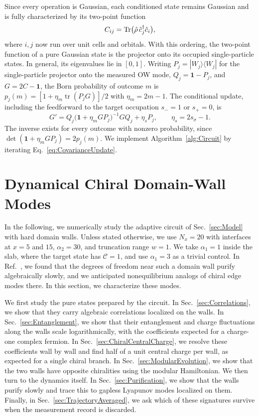 \documentclass[aps,prb,twocolumn,superscriptaddress,longbibliography,floatfix]{revtex4-2}
\newcommand{\mc}[1]{\mathcal{#1}}
\newcommand{\Id}{\mathbf{1}}
\begin{document}
Since every operation is Gaussian, each conditioned state remains Gaussian and is fully characterized by its two-point function
\begin{equation}
    C_{ij}=\Tr\!\big(\hat\rho\,\hat c_j^\dagger\hat c_i\big),
    \label{eq:TwoPoint}
\end{equation}
where $i,j$ now run over unit cells and orbitals. With this ordering, the two-point function of a pure Gaussian state is the projector onto its occupied single-particle states. In general, its eigenvalues lie in $[0,1]$. Writing $P_j=|W_j\rangle\langle W_j|$ for the single-particle projector onto the measured OW mode, $Q_j=\Id-P_j$, and $G=2C-\Id$, the Born probability of outcome $m$ is $p_j(m)=[1+\eta_m\operatorname{tr}(P_jG)]/2$ with $\eta_m=2m-1$. The conditional update, including the feedforward to the target occupation $s_-=1$ or $s_+=0$, is~\cite{bravyi2004lagrangian,BhuiyanPanJian2026}
\begin{equation}
    G'=Q_j\big(\Id+\eta_mGP_j\big)^{-1}GQ_j+\eta_sP_j,
    \qquad \eta_s=2s_\sigma-1.
    \label{eq:CovarianceUpdate}
\end{equation}
The inverse exists for every outcome with nonzero probability, since $\det(\Id+\eta_mGP_j)=2p_j(m)$. We implement Algorithm~\ref{alg:Circuit} by iterating Eq.~\eqref{eq:CovarianceUpdate}.



\section{Dynamical Chiral Domain-Wall Modes}
\label{sec:Results}

In the following, we numerically study the adaptive circuit of Sec.~\ref{sec:Model} with hard domain walls. Unless stated otherwise, we use $N_x=20$ with interfaces at $x=5$ and $15$, $\alpha_2=30$, and truncation range $w=1$. We take $\alpha_1=1$ inside the slab, where the target state has $\mc C=1$, and use $\alpha_1=3$ as a trivial control. In Ref.~\cite{BhuiyanPanJian2026}, we found that the degrees of freedom near such a domain wall purify algebraically slowly, and we anticipated nonequilibrium analogs of chiral edge modes there. In this section, we characterize these modes.

We first study the pure states prepared by the circuit. In Sec.~\ref{sec:Correlations}, we show that they carry algebraic correlations localized on the walls. In Sec.~\ref{sec:Entanglement}, we show that their entanglement and charge fluctuations along the walls scale logarithmically, with the coefficients expected for a charge-one complex fermion. In Sec.~\ref{sec:ChiralCentralCharge}, we resolve these coefficients wall by wall and find half of a unit central charge per wall, as expected for a single chiral branch. In Sec.~\ref{sec:ModularEvolution}, we show that the two walls have opposite chiralities using the modular Hamiltonian. We then turn to the dynamics itself. In Sec.~\ref{sec:Purification}, we show that the walls purify slowly and trace this to gapless Lyapunov modes localized on them. Finally, in Sec.~\ref{sec:TrajectoryAveraged}, we ask which of these signatures survive when the measurement record is discarded.
\end{document}
